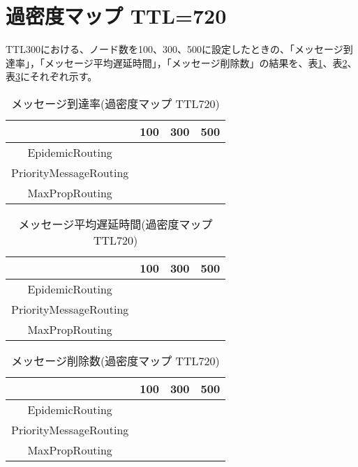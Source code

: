 \documentclass[11pt]{icsthesis}
\begin{document}
\section{過密度マップ TTL=720}
TTL300における、ノード数を100、300、500に設定したときの、「メッセージ到達率」，「メッセージ平均遅延時間」，「メッセージ削除数」の結果を、表\ref{kamituTtl720deliveryprob}、表\ref{kamituTtl720latencyavg}、表\ref{kamituTtl720dropped}にそれぞれ示す。
\begin{table}[H]
 \begin{center}
      \caption[]{メッセージ到達率(過密度マップ TTL720)}
      \label{kamituTtl720deliveryprob}
      \begin{tabular}{|c|c|c|c|}
\hline
&100&300&500\\
\hline
EpidemicRouting&&&\\
\hline
PriorityMessageRouting&&&\\
\hline
MaxPropRouting&&&\\
\hline
      \end{tabular}
    \end{center}
\end{table}

\begin{table}[H]
 \begin{center}
      \caption[]{メッセージ平均遅延時間(過密度マップ TTL720)}
      \label{kamituTtl720latencyavg}
      \begin{tabular}{|c|c|c|c|}
\hline
&100&300&500\\
\hline
EpidemicRouting&&&\\
\hline
PriorityMessageRouting&&&\\
\hline
MaxPropRouting&&&\\
\hline
      \end{tabular}
    \end{center}
\end{table}

\begin{table}[H]
 \begin{center}
      \caption[]{メッセージ削除数(過密度マップ TTL720)}
      \label{kamituTtl720dropped}
      \begin{tabular}{|c|c|c|c|}
\hline
&100&300&500\\
\hline
EpidemicRouting&&&\\
\hline
PriorityMessageRouting&&&\\
\hline
MaxPropRouting&&&\\
\hline
      \end{tabular}
    \end{center}
\end{table}
\end{document}
